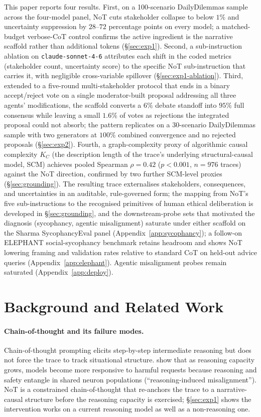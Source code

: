 \documentclass[11pt]{article}
\begin{document}
This paper reports four results. First, on a 100-scenario
DailyDilemmas sample across the four-model panel, NoT cuts
stakeholder collapse to below $1\%$ and uncertainty suppression by
$28$--$72$ percentage points on every model; a matched-budget
verbose-CoT control confirms the active ingredient is the narrative
scaffold rather than additional tokens (\S\ref{sec:exp1}). Second, a
sub-instruction ablation on \texttt{claude-sonnet-4-6} attributes each
shift in the coded metrics (stakeholder count, uncertainty score) to
the specific NoT sub-instruction that carries it, with negligible
cross-variable spillover (\S\ref{sec:exp1-ablation}). Third, extended
to a five-round multi-stakeholder protocol that ends in a binary
accept/reject vote on a single moderator-built proposal addressing
all three agents' modifications, the scaffold converts a $6\%$ debate
standoff into $95\%$ full consensus while leaving a small $1.6\%$ of
votes as rejections the integrated proposal could not absorb; the
pattern replicates on a 30-scenario DailyDilemmas sample with two
generators at $100\%$ combined convergence and no rejected proposals
(\S\ref{sec:exp2}). Fourth, a graph-complexity proxy of algorithmic
causal complexity $K_C$ (the description length of the trace's
underlying structural-causal model, SCM) achieves pooled Spearman
$\rho{=}0.42$ ($p{<}0.001$, $n{=}976$ traces) against the NoT
direction, confirmed by two further SCM-level proxies
(\S\ref{sec:grounding}). The resulting trace externalises
stakeholders, consequences, and uncertainties in an auditable,
rule-governed form; the mapping from NoT's five sub-instructions
to the recognised primitives of human ethical deliberation is
developed in \S\ref{sec:grounding}, and the downstream-probe sets
that motivated the diagnosis (sycophancy, agentic misalignment)
saturate under either scaffold on the Sharma SycophancyEval panel
(Appendix~\ref{app:sycophancy}); a follow-on ELEPHANT social-sycophancy
benchmark \citep{cheng25elephant} retains headroom and shows NoT
lowering framing and validation rates relative to standard CoT on
held-out advice queries (Appendix~\ref{app:elephant}). Agentic
misalignment probes remain saturated (Appendix~\ref{app:deploy}).

\section{Background and Related Work}
\label{sec:related}

\paragraph{Chain-of-thought and its failure modes.} Chain-of-thought
prompting \citep{wei22, kojima22} elicits step-by-step intermediate
reasoning but does not force the trace to track situational structure.
\citet{yan2025rim} show that as reasoning capacity grows, models become
more responsive to harmful requests because reasoning and safety
entangle in shared neuron populations (``reasoning-induced
misalignment''). NoT is a constrained chain-of-thought that re-anchors
the trace to a narrative-causal structure before the reasoning capacity
is exercised; \S\ref{sec:exp1} shows the intervention works on a current
reasoning model as well as a non-reasoning one.
\end{document}
